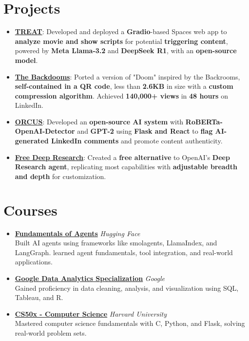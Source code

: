 \documentclass[letterpaper,10.8pt]{article}
\newcommand{\resumeItem}[2]{
  \item\small{
    \textbf{#1}{: #2 \vspace{-2pt}}
  }
}
\newcommand{\resumeSubHeadingListStart}{\begin{itemize}[leftmargin=*]}
\newcommand{\resumeSubHeadingListEnd}{\end{itemize}}
\begin{document}
\section*{Projects}
\resumeSubHeadingListStart
  \resumeItem{\href{https://trytreat.tech/}{TREAT}}{Developed and deployed a \textbf{Gradio}-based Spaces web app to \textbf{analyze movie and show scripts} for potential \textbf{triggering content}, powered by \textbf{Meta Llama-3.2} and \textbf{DeepSeek R1}, with an \textbf{open-source model}.}
  \vspace{5pt}
  \resumeItem{\href{https://github.com/Kuberwastaken/backdooms}{The Backdooms}}{Ported a version of "Doom" inspired by the Backrooms, \textbf{self-contained in a QR code}, less than \textbf{2.6KB} in size with a \textbf{custom compression algorithm}. Achieved \textbf{140,000+ views} in \textbf{48 hours} on LinkedIn.}
  \vspace{5pt}
  \resumeItem{\href{https://github.com/Kuberwastaken/ORCUS}{ORCUS}}{Developed an \textbf{open-source AI system} with \textbf{RoBERTa-OpenAI-Detector} and \textbf{GPT-2} using \textbf{Flask and React} to \textbf{flag AI-generated LinkedIn comments} and promote content authenticity.}
  \vspace{5pt}
  \resumeItem{\href{https://github.com/Kuberwastaken/free-deep-research}{Free Deep Research}}{Created a \textbf{free alternative} to OpenAI’s \textbf{Deep Research agent}, replicating most capabilities with \textbf{adjustable breadth and depth} for customization.}
\resumeSubHeadingListEnd

\section*{Courses}
\begin{itemize}[leftmargin=0.15in]
  \item \textbf{\href{https://cdn-uploads.huggingface.co/production/uploads/noauth/iD2BAETFKpkiYBWPVz1fn.webp}{Fundamentals of Agents}} \hfill \textit{Hugging Face}\\
    Built AI agents using frameworks like smolagents, LlamaIndex, and LangGraph. learned agent fundamentals, tool integration, and real-world applications.
  \item \textbf{\href{https://www.coursera.org/account/accomplishments/specialization/AS9JOBALFZSL}{Google Data Analytics Specialization}} \hfill \textit{Google}\\
    Gained proficiency in data cleaning, analysis, and visualization using SQL, Tableau, and R.
  \item \textbf{\href{https://certificates.cs50.io/fe4b0a5a-c586-4a15-91ec-6b8a65f829e4.pdf?size=letter}{CS50x - Computer Science}} \hfill \textit{Harvard University}\\
    Mastered computer science fundamentals with C, Python, and Flask, solving real-world problem sets.
\end{itemize}
\end{document}
